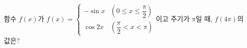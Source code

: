 함수 $f(x)$가 $f(x)=\begin{cases} -\sin x & \left(0\le x\le\dfrac{\pi}{2}\right) \\[1ex] \cos 2x & \left(\dfrac{\pi}{2}<x<\pi\right) \end{cases}$이고 주기가 $\pi$일 때, $f(4\pi)$의 값은?
